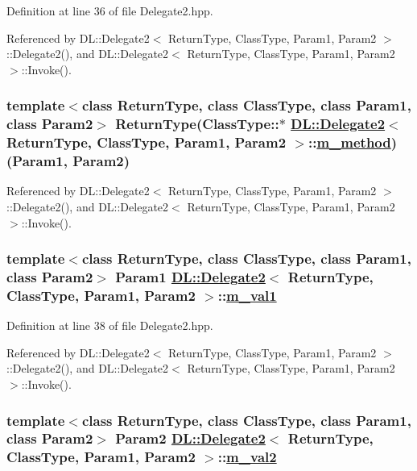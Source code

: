 Definition at line 36 of file Delegate2.hpp.

Referenced by DL::Delegate2$<$ Return\-Type, Class\-Type, Param1, Param2 $>$::Delegate2(), and DL::Delegate2$<$ Return\-Type, Class\-Type, Param1, Param2 $>$::Invoke().\hypertarget{classDL_1_1Delegate2_r1}{
\subsubsection[m\_\-method]{\setlength{\rightskip}{0pt plus 5cm}template$<$class Return\-Type, class Class\-Type, class Param1, class Param2$>$ Return\-Type(Class\-Type::$\ast$ \hyperlink{classDL_1_1Delegate2}{DL::Delegate2}$<$ Return\-Type, Class\-Type, Param1, Param2 $>$::\hyperlink{classDL_1_1Delegate2_r1}{m\_\-method})(Param1, Param2)}}
\label{classDL_1_1Delegate2_r1}




Referenced by DL::Delegate2$<$ Return\-Type, Class\-Type, Param1, Param2 $>$::Delegate2(), and DL::Delegate2$<$ Return\-Type, Class\-Type, Param1, Param2 $>$::Invoke().\hypertarget{classDL_1_1Delegate2_r2}{
\subsubsection[m\_\-val1]{\setlength{\rightskip}{0pt plus 5cm}template$<$class Return\-Type, class Class\-Type, class Param1, class Param2$>$ Param1 \hyperlink{classDL_1_1Delegate2}{DL::Delegate2}$<$ Return\-Type, Class\-Type, Param1, Param2 $>$::\hyperlink{classDL_1_1Delegate2_r2}{m\_\-val1}}}
\label{classDL_1_1Delegate2_r2}




Definition at line 38 of file Delegate2.hpp.

Referenced by DL::Delegate2$<$ Return\-Type, Class\-Type, Param1, Param2 $>$::Delegate2(), and DL::Delegate2$<$ Return\-Type, Class\-Type, Param1, Param2 $>$::Invoke().\hypertarget{classDL_1_1Delegate2_r3}{
\subsubsection[m\_\-val2]{\setlength{\rightskip}{0pt plus 5cm}template$<$class Return\-Type, class Class\-Type, class Param1, class Param2$>$ Param2 \hyperlink{classDL_1_1Delegate2}{DL::Delegate2}$<$ Return\-Type, Class\-Type, Param1, Param2 $>$::\hyperlink{classDL_1_1Delegate2_r3}{m\_\-val2}}}
\label{classDL_1_1Delegate2_r3}




